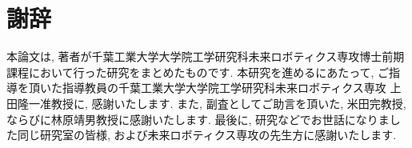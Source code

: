 \chapter*{謝辞}

本論文は, 著者が千葉工業大学大学院工学研究科未来ロボティクス専攻博士前期課程において行った研究をまとめたものです. 
本研究を進めるにあたって, ご指導を頂いた指導教員の千葉工業大学大学院工学研究科未来ロボティクス専攻 上田隆一准教授に, 感謝いたします. 
また, 副査としてご助言を頂いた, 米田完教授, ならびに林原靖男教授に感謝いたします. 
最後に, 研究などでお世話になりました同じ研究室の皆様, および未来ロボティクス専攻の先生方に感謝いたします. 
